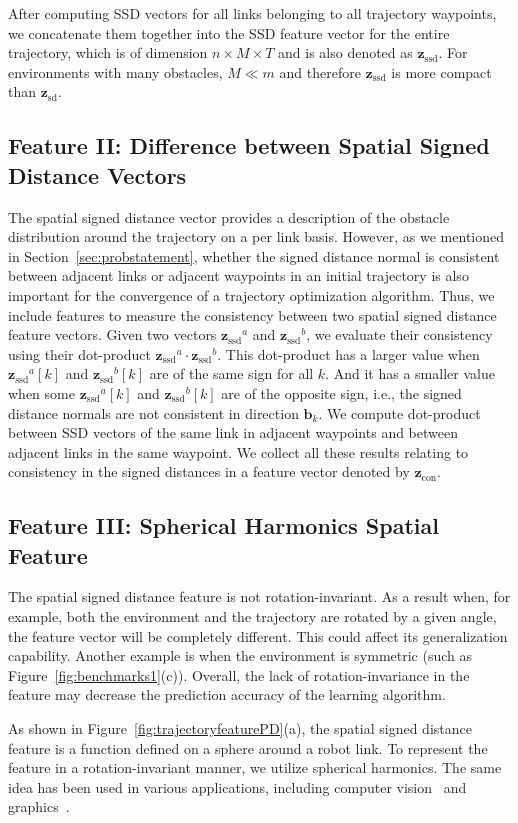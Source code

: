 \documentclass[letterpaper, 10 pt, conference]{ieeeconf}  %
\newcommand{\fsd}{\mbox{$\mathbf z_{\text{sd}}$}}
\newcommand{\fssd}{\mbox{$\mathbf z_{\text{ssd}}$}}
\newcommand{\fcon}{\mbox{$\mathbf z_{\text{con}}$}}
\begin{document}
After computing SSD vectors for all links belonging to all trajectory waypoints, we concatenate them together into the SSD feature vector for the entire trajectory, which is of dimension $n\times M \times T$ and is also denoted as $\fssd$. For environments with many obstacles, $M \ll m$ and therefore $\fssd$ is more compact than $\fsd$.



\subsection{Feature II: Difference between Spatial Signed Distance Vectors}
The spatial signed distance vector provides a description of the obstacle distribution around the trajectory on a per link basis. However, as we mentioned in Section~\ref{sec:probstatement}, whether the signed distance normal is consistent between adjacent links or adjacent waypoints in an initial trajectory is also important for the convergence of a trajectory optimization algorithm. Thus, we include features to measure the consistency between two spatial signed distance feature vectors. Given two vectors $\fssd^a$ and $\fssd^b$, we evaluate their consistency using their dot-product $\fssd^a \cdot \fssd^b$. This dot-product has a larger value when $\fssd^a[k]$ and $\fssd^b[k]$ are of the same sign for all $k$. And it has a smaller value when some $\fssd^a[k]$ and $\fssd^b[k]$ are of the opposite sign, i.e., the signed distance normals are not consistent in direction $\mathbf b_k$. We compute dot-product between SSD vectors of the same link in adjacent waypoints and between adjacent links in the same waypoint. We collect all these results relating to consistency in the signed distances in a feature vector denoted by $\fcon$.

\subsection{Feature III: Spherical Harmonics Spatial Feature}
The spatial signed distance feature is not rotation-invariant.
As a result when, for example, both the environment and the trajectory are rotated by a given angle, the feature vector will be completely different.  This could affect its generalization capability. Another example is when the environment is symmetric (such as Figure~\ref{fig:benchmarks1}(c)).  Overall, the lack of rotation-invariance in the feature may decrease the prediction accuracy of the learning algorithm.

As shown in Figure~\ref{fig:trajectoryfeaturePD}(a), the spatial signed distance feature is a function defined on a sphere around a robot link. To represent the feature in a rotation-invariant manner, we utilize spherical harmonics. The same idea has been used in various applications, including computer vision~\cite{Frome:2004:ROR} and graphics~\cite{Kazhdan:2003:RIS}.
\end{document}
